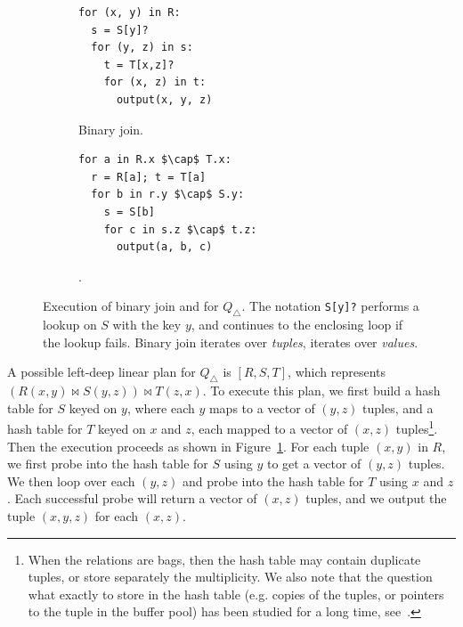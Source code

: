 \begin{figure}
  \begin{subfigure}[b]{0.45\linewidth}
\begin{lstlisting}
for (x, y) in R:
  s = S[y]?
  for (y, z) in s:
    t = T[x,z]?
    for (x, z) in t:
      output(x, y, z)
\end{lstlisting}
    \caption{Binary join.}
    \label{fig:background:binary-join}
  \end{subfigure}
  \begin{subfigure}[b]{0.45\linewidth}
    \centering
\begin{lstlisting}
for a in R.x $\cap$ T.x:
  r = R[a]; t = T[a]
  for b in r.y $\cap$ S.y:
    s = S[b]
    for c in s.z $\cap$ t.z:
      output(a, b, c)
\end{lstlisting}
    \caption{\GJ.}
    \label{fig:background:gj}
  \end{subfigure}
  \caption{Execution of binary join and \GJ for $Q_\triangle$.  The
    notation \lstinline|S[y]?| performs a lookup on $S$ with the key
    $y$, and continues to the enclosing loop if the lookup fails.
    Binary join iterates over {\em tuples}, \GJ iterates over {\em
      values}.}
\end{figure}

\begin{example}
  A possible left-deep linear plan for $Q_\triangle$ is $[R, S, T]$,
  which represents $(R(x,y) \Join S(y,z)) \Join T(z,x)$.  To execute
  this plan, we first build a hash table for $S$ keyed on $y$, where
  each $y$ maps to a vector of $(y,z)$ tuples, 
  and a hash table for $T$ keyed on $x$ and $z$, each mapped to a
  vector of $(x,z)$ tuples\footnote{When the relations are bags, then
    the hash table may contain duplicate tuples, or store separately
    the multiplicity.  We also note that the question what exactly to
    store in the hash table (e.g. copies of the tuples, or pointers to
    the tuple in the buffer pool) has been studied for a long time,
    see~\cite{DBLP:journals/csur/Graefe93}.}.  Then the execution
  proceeds as shown in Figure~\ref{fig:background:binary-join}.  For each
  tuple $(x, y)$ in $R$, we first probe into the hash table for $S$
  using $y$ to get a vector of $(y, z)$ tuples.  We then loop over
  each $(y, z)$ and probe into the hash table for $T$ using $x$ and
  $z$.  Each successful probe will return a vector of $(x, z)$ tuples,
  and we output the tuple $(x, y, z)$ for each $(x, z)$.
\end{example}

